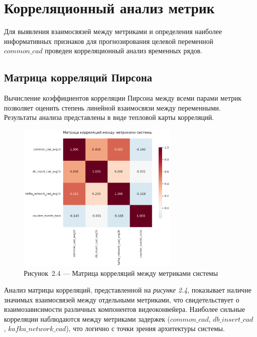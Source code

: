 \section{Корреляционный анализ метрик}

\hspace*{1.25cm}Для выявления взаимосвязей между метриками и определения наиболее информативных признаков для прогнозирования целевой переменной $common\_cad$ проведен корреляционный анализ временных рядов.

\subsection{Матрица корреляций Пирсона}

\hspace*{1.25cm}Вычисление коэффициентов корреляции Пирсона между всеми парами метрик позволяет оценить степень линейной взаимосвязи между переменными. Результаты анализа представлены в виде тепловой карты корреляций.

\begin{figure}[H]
	\centering
	\includegraphics[width=0.7\textwidth]{figures/chapter2/correlation_matrix_heatmap.png}
	\caption*{Рисунок~2.4 --- Матрица корреляций между метриками системы}
	\label{fig:correlation_matrix}
\end{figure}

\hspace*{1.25cm}Анализ матрицы корреляций, представленной на \textit{рисунке 2.4}, показывает наличие значимых взаимосвязей между отдельными метриками, что свидетельствует о взаимозависимости различных компонентов видеоконвейера. Наиболее сильные корреляции наблюдаются между метриками задержек ($common\_cad$, $db\_insert\_cad$, $kafka\_network\_cad$), что логично с точки зрения архитектуры системы.


